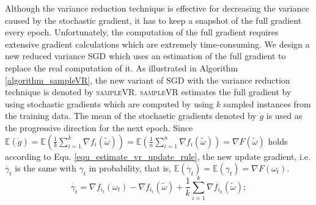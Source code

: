\documentclass[letterpaper]{article}
\begin{document}
Although  the variance reduction technique is effective for decreasing the variance caused by the stochastic gradient, it has to keep a snapshot of the full gradient  every epoch. Unfortunately, the computation of the full gradient requires extensive gradient calculations which  are extremely time-consuming.  We design a new reduced variance SGD which uses an estimation of the full gradient to replace the real computation of it.  As illustrated in Algorithm \ref{algorithm_sampleVR}, the new variant of SGD with the variance reduction technique is denoted by \textsc{sampleVR}.  \textsc{sampleVR} estimates the full gradient by using  stochastic gradients which are computed by using $k$ sampled  instances  from the training data.  The mean of the stochastic gradients denoted by $\dot{g}$ is used as the progressive direction for the next epoch. Since  $\mathbb{E}(\dot{g}) = \mathbb{E} \left(  \frac{1}{k}\sum\limits_{i=1}^k\nabla f_i(\tilde{\omega}) \right)=  \mathbb{E} \left (\frac{1}{n}\sum\limits_{i=1}^n\nabla f_i(\tilde{\omega}) \right)  =  \nabla F(\tilde{\omega})$ holds according to Equ. \ref{equ_estimate_vr_update_rule}, the new update gradient, i.e. $\dot{\gamma_t}$ is the same with $\gamma_t$ in probability, that is, $\mathbb{E} (  \dot{\gamma_t}) = \mathbb{E} (\gamma_t) = \nabla F(\omega_{t})$. 
\begin{equation}
\label{equ_estimate_vr_update_rule}
\dot{\gamma_t}=\nabla f_{i_t}(\omega_{t})-\nabla f_{i_t}(\tilde{\omega})+\frac{1}{k}\sum\limits_{i=1}^k\nabla f_{i_k}(\tilde{\omega});
\end{equation}
\end{document}
